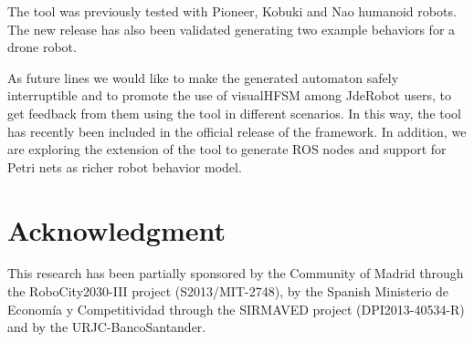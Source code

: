 \documentclass[journal,twoside]{JoPhA}
\begin{document}
The tool was previously tested with Pioneer, Kobuki and Nao humanoid robots. The new release has also been validated generating two example behaviors for a drone robot. 

As future lines we would like to make the generated automaton safely interruptible and to promote the use of visualHFSM among JdeRobot users, to get feedback from them using the tool in different scenarios. In this way, the tool has recently been included in the official release of the framework. In addition, we are exploring the extension of the tool to generate ROS nodes and support for Petri nets as richer robot behavior model.

\section*{Acknowledgment}
This  research  has  been  partially  sponsored  by  the Community of Madrid through the RoboCity2030-III project (S2013/MIT-2748), by the Spanish Ministerio de Economía y Competitividad through the SIRMAVED project (DPI2013-40534-R) and by the URJC-BancoSantander.
\end{document}
